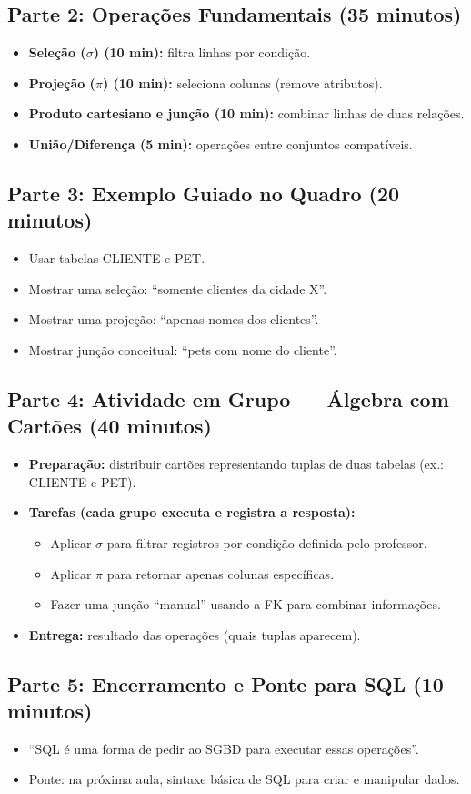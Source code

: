 \documentclass[12pt,a4paper]{article}
\begin{document}
\subsection*{Parte 2: Operações Fundamentais (35 minutos)}
\begin{itemize}[leftmargin=*,itemsep=0.35em]
  \item \textbf{Seleção ($\sigma$) (10 min):} filtra linhas por condição.
  \item \textbf{Projeção ($\pi$) (10 min):} seleciona colunas (remove atributos).
  \item \textbf{Produto cartesiano e junção (10 min):} combinar linhas de duas relações.
  \item \textbf{União/Diferença (5 min):} operações entre conjuntos compatíveis.
\end{itemize}

\subsection*{Parte 3: Exemplo Guiado no Quadro (20 minutos)}
\begin{itemize}[leftmargin=*,itemsep=0.35em]
  \item Usar tabelas CLIENTE e PET.
  \item Mostrar uma seleção: ``somente clientes da cidade X''.
  \item Mostrar uma projeção: ``apenas nomes dos clientes''.
  \item Mostrar junção conceitual: ``pets com nome do cliente''.
\end{itemize}

\subsection*{Parte 4: Atividade em Grupo --- Álgebra com Cartões (40 minutos)}
\begin{itemize}[leftmargin=*,itemsep=0.35em]
  \item \textbf{Preparação:} distribuir cartões representando tuplas de duas tabelas (ex.: CLIENTE e PET).
  \item \textbf{Tarefas (cada grupo executa e registra a resposta):}
  \begin{itemize}[leftmargin=*,itemsep=0.25em]
    \item Aplicar $\sigma$ para filtrar registros por condição definida pelo professor.
    \item Aplicar $\pi$ para retornar apenas colunas específicas.
    \item Fazer uma junção ``manual'' usando a FK para combinar informações.
  \end{itemize}
  \item \textbf{Entrega:} resultado das operações (quais tuplas aparecem).
\end{itemize}

\subsection*{Parte 5: Encerramento e Ponte para SQL (10 minutos)}
\begin{itemize}[leftmargin=*,itemsep=0.35em]
  \item ``SQL é uma forma de pedir ao SGBD para executar essas operações''.
  \item Ponte: na próxima aula, sintaxe básica de SQL para criar e manipular dados.
\end{itemize}
\end{document}
